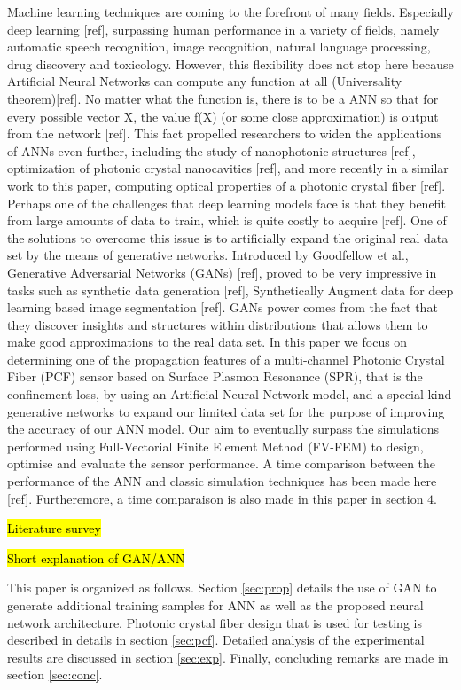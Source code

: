 \documentclass[draft, a4, 10pt, onecolumn]{IEEEtran}
\begin{document}
Machine learning techniques are coming to the forefront of many fields. Especially deep learning [ref], surpassing human performance in a variety of fields, namely automatic speech recognition, image recognition, natural language processing, drug discovery and toxicology. However, this flexibility does not stop here because Artificial Neural Networks can compute any function at all (Universality theorem)[ref]. No matter what the function is, there is to be a ANN so that for every possible vector X, the value f(X) (or some close approximation) is output from the network [ref]. This fact propelled researchers to widen the applications of ANNs even further, including the study of nanophotonic structures [ref], optimization of photonic crystal nanocavities [ref], and more recently in a similar work to this paper, computing optical properties of a photonic crystal fiber [ref]. Perhaps one of the challenges that deep learning models face is that they benefit from large amounts of data to train, which is quite costly to acquire [ref]. One of the solutions to overcome this issue is to artificially expand the original real data set by the means of generative networks. Introduced by Goodfellow et al., Generative Adversarial Networks (GANs) [ref], proved to be very impressive in tasks such as synthetic data generation [ref], Synthetically Augment data for deep learning based image segmentation [ref]. GANs power comes from the fact that they discover insights and structures within distributions that allows them to make good approximations to the real data set. In this paper we focus on determining one of the propagation features of a multi-channel Photonic Crystal Fiber (PCF) sensor based on Surface Plasmon Resonance (SPR), that is the confinement loss, by using an Artificial Neural Network model, and a special kind generative networks to expand our limited data set for the purpose of  improving the accuracy of our ANN model. Our aim to eventually surpass the simulations performed using Full-Vectorial Finite Element Method (FV-FEM) to design, optimise and evaluate the sensor performance. A time comparison between the performance of the ANN and classic simulation techniques has been made here [ref]. Furtheremore, a time comparaison is also made in this paper in section $4$.

\hl{Literature survey}

\hl{Short explanation of GAN/ANN}

This paper is organized as follows. Section \ref{sec:prop} details the use of GAN to generate additional training samples for ANN as well as the proposed neural network architecture. Photonic crystal fiber design that is used for testing is described in details in section \ref{sec:pcf}. Detailed analysis of the experimental results are discussed in section \ref{sec:exp}. Finally, concluding remarks are made in section \ref{sec:conc}.
\end{document}
